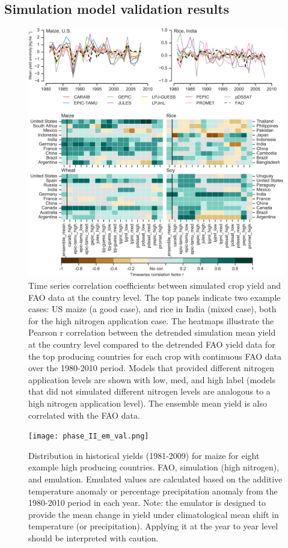 \documentclass[preprint, 5p, times, twocolumn]{elsarticle}
\begin{document}
\subsection{Simulation model validation results}
\begin{figure}[!htb]
    \centering
    \includegraphics[width=0.8\linewidth]{Agformet_validation.png}
    \caption{Time series correlation coefficients between simulated crop yield and FAO data at the country level. The top panels indicate two example cases: US maize (a good case), and rice in India (mixed case), both for the high nitrogen application case. The heatmaps illustrate the Pearson r correlation between the detrended simulation mean yield at the country level compared to the detrended FAO yield data for the top producing countries for each crop with continuous FAO data over the 1980-2010 period. Models that provided different nitrogen application levels are shown with low, med, and high label (models that did not simulated different nitrogen levels are analogous to a high nitrogen application level). The ensemble mean yield is also correlated with the FAO data.}
    \label{fig:simulation_val}
\end{figure}

\begin{figure}[!htb]
    \centering
    \texttt{[image: phase\_II\_em\_val.png]}
    \caption{Distribution in historical yields (1981-2009) for maize for eight example high producing countries. FAO, simulation (high nitrogen), and emulation. Emulated values are calculated based on the additive temperature anomaly or percentage precipitation anomaly from the 1980-2010 period in each year. Note: the emulator is designed to provide the mean change in yield under climatological mean shift in temperature (or precipitation). Applying it at the year to year level should be interpreted with caution.}
    \label{fig:sim_em_val}
\end{figure}
\end{document}
